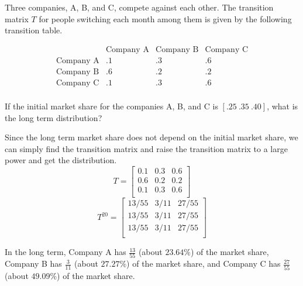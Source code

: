\begin{example}
    Three companies, A, B, and C, compete against each other. The transition matrix \( T \) for people switching each month among them is given by the following transition table.

    \[
        \begin{array}{c|ccc}
                             & \text{Company A} & \text{Company B} & \text{Company C} \\
            \hline
            \text{Company A} & .1               & .3               & .6               \\
            \text{Company B} & .6               & .2               & .2               \\
            \text{Company C} & .1               & .3               & .6               \\
        \end{array}
    \]

    If the initial market share for the companies A, B, and C is \( \left[ .25 \ .35 \ .40 \right] \), what is the long term distribution?
\end{example}

\begin{solution}
    Since the long term market share does not depend on the initial market share, we can simply find the transition matrix and raise the transition matrix to a large power and get the distribution.
    \[
        T = \begin{bmatrix}
            0.1 & 0.3 & 0.6 \\
            0.6 & 0.2 & 0.2 \\
            0.1 & 0.3 & 0.6 \\
        \end{bmatrix}
    \]
    \[
        T^{20} = \left[ \begin{array}{ccc}
                13/55 & 3/11 & 27/55 \\
                13/55 & 3/11 & 27/55 \\
                13/55 & 3/11 & 27/55 \\
            \end{array} \right]
    \]

    In the long term, Company A has \( \frac{13}{55} \) (about \( 23.64\% \)) of the market share, Company B has \( \frac{3}{11} \) (about \( 27.27\% \)) of the market share, and Company C has \( \frac{27}{55} \) (about \( 49.09\% \)) of the market share.
\end{solution}

